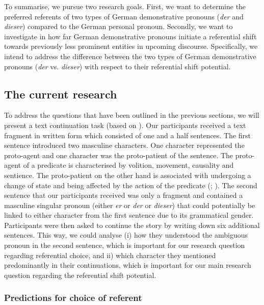 \documentclass[output=paper,colorlinks,citecolor=brown]{langscibook}
\begin{document}
To summarise, we pursue two research goals. First, we want to determine the preferred referents of two types of German demonstrative pronouns (\textit{der} and \textit{dieser}) compared to the German personal pronoun. Secondly, we want to investigate in how far German demonstrative pronouns initiate a referential shift towards previously less prominent entities in upcoming discourse. Specifically, we intend to address the difference between the two types of German demonstrative pronouns (\textit{der} vs. \textit{dieser}) with respect to their referential shift potential. 

\subsection{The current research}\label{sec:fuchs:1.4}

To address the questions that have been outlined in the previous sections, we will present a text continuation task (based on \citealt{GernsbacherShroyer1989}). Our participants received a text fragment in written form which consisted of one and a half sentences. The first sentence introduced two masculine characters. One character represented the proto-agent and one character was the proto-patient of the sentence. The proto-agent of a predicate is characterised by volition, movement, causality and sentience. The proto-patient on the other hand is associated with undergoing a change of state and being affected by the action of the predicate (\citealt{Dowty1991}; \citealt{Primus2012}). The second sentence that our participants received was only a fragment and contained a masculine singular pronoun (either \textit{er} or \textit{der} or \textit{dieser}) that could potentially be linked to either character from the first sentence due to its grammatical gender. Participants were then asked to continue the story by writing down six additional sentences. This way, we could analyse (i) how they understood the ambiguous pronoun in the second sentence, which is important for our research question regarding referential choice, and ii) which character they mentioned predominantly in their continuations, which is important for our main research question regarding the referential shift potential.

\subsubsection{Predictions for choice of referent}\label{sec:fuchs:1.4.1}
\end{document}
